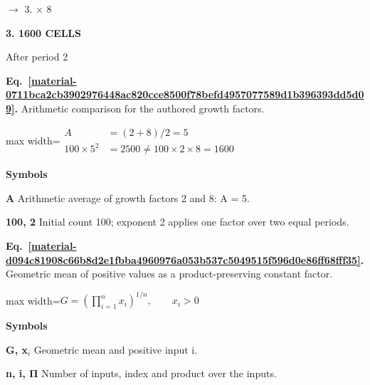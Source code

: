\documentclass[11pt,a4paper]{article}
\begin{document}
\par\noindent $\longrightarrow$ 3. \ensuremath{\times} 8
\par\medskip\noindent\textcolor{pcd3}{\textbf{3. 1600 CELLS}}\par
After period 2


\medskip

\par\medskip
\noindent\begin{minipage}{\linewidth}
\label{material-0711bca2cb3902976448ac820cce8500f78befd4957077589d1b396393dd5d09}
\noindent\textbf{Eq.~\ref*{material-0711bca2cb3902976448ac820cce8500f78befd4957077589d1b396393dd5d09}.} Arithmetic comparison for the authored growth factors.\par\nopagebreak
\begin{center}\begin{adjustbox}{max width=\linewidth}$\displaystyle \begin{aligned}A&=(2+8)/2=5\\100\times5^2&=2500\ne100\times2\times8=1600\end{aligned}$\end{adjustbox}\end{center}

\par\noindent\textbf{Symbols}

\par\noindent\textbf{A} Arithmetic average of growth factors 2 and 8: A = 5.

\par\noindent\textbf{100, 2} Initial count 100; exponent 2 applies one factor over two equal periods.

\end{minipage}\par
\medskip

\par\medskip
\noindent\begin{minipage}{\linewidth}
\label{material-d094c81908c66b8d2e1fbba4960976a053b537c5049515f596d0e86ff68fff35}
\noindent\textbf{Eq.~\ref*{material-d094c81908c66b8d2e1fbba4960976a053b537c5049515f596d0e86ff68fff35}.} Geometric mean of positive values as a product-preserving constant factor.\par\nopagebreak
\begin{center}\begin{adjustbox}{max width=\linewidth}$\displaystyle G = \left(\prod_{i=1}^{n} x_i\right)^{1/n}, \qquad x_i > 0$\end{adjustbox}\end{center}

\par\noindent\textbf{Symbols}

\par\noindent\textbf{G, x\ensuremath{{}_i}} Geometric mean and positive input i.

\par\noindent\textbf{n, i, Π} Number of inputs, index and product over the inputs.

\end{minipage}\par
\medskip
\end{document}
